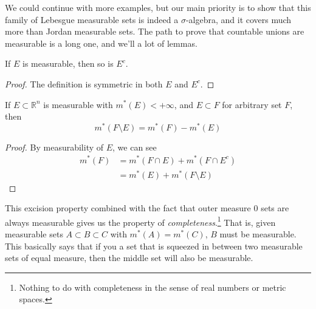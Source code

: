   We could continue with more examples, but our main priority is to show that this family of Lebesgue measurable sets is indeed a $\sigma$-algebra, and it covers much more than Jordan measurable sets. The path to prove that countable unions are measurable is a long one, and we'll a lot of lemmas. 

  \begin{lemma}
    If $E$ is measurable, then so is $E^c$. 
  \end{lemma}
  \begin{proof}
    The definition is symmetric in both $E$ and $E^c$. 
  \end{proof}

  \begin{lemma}
    If $E \subset \mathbb{R}^n$ is measurable with $m^\ast (E) < +\infty$, and $E \subset F$ for arbitrary set $F$, then 
    \begin{equation}
      m^\ast (F \setminus E) = m^\ast(F) - m^\ast(E)
    \end{equation}
  \end{lemma}
  \begin{proof}
    By measurability of $E$, we can see 
    \begin{align}
      m^\ast (F) & = m^\ast (F \cap E) + m^\ast (F \cap E^c) \\
                 & = m^\ast (E) + m^\ast (F \setminus E)
    \end{align}
  \end{proof}

  This excision property combined with the fact that outer measure 0 sets are always measurable gives us the property of \textit{completeness}.\footnote{Nothing to do with completeness in the sense of real numbers or metric spaces.} That is, given measurable sets $A \subset B \subset C$ with $m^\ast(A) = m^\ast (C)$, $B$ must be measurable. This basically says that if you a set that is squeezed in between two measurable sets of equal measure, then the middle set will also be measurable. 

